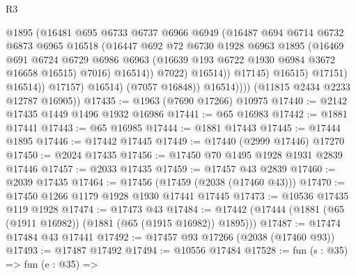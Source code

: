 \begin{lexlean}{R3}
\begin{coremodule}
                                  @1895
                                  (@16481
                                    @695
                                    @6733
                                    @6737
                                    @6966
                                    @6949
                                    (@16487
                                      @694
                                      @6714
                                      @6732
                                      @6873
                                      @6965
                                      @16518
                                      (@16447
                                        @692
                                        @72
                                        @6730
                                        @1928
                                        @6963
                                        @1895
                                        (@16469
                                          @691
                                          @6724
                                          @6729
                                          @6986
                                          @6963
                                          (@16639 @193 @6722 @1930 @6984 @3672 @16658 @16515)
                                          @7016)
                                        @16514))
                                    @7022)
                                  @16514))
                              @17145)
                            @16515)
                          @17151)
                        @16514))
                    @17157)
                  @16514)
                (@7057 @16848))
              @16514))))
      (@11815 @2434 @2233 @12787 @16905))
@17435 := @1963 (@7690 @17266) @10975
@17440 := @2142 @17435 @1449 @1496 @1932 @16986
@17441 := @65 @16983
@17442 := @1881 @17441
@17443 := @65 @16985
@17444 := @1881 @17443
@17445 := @17444 @1895
@17446 := @17442 @17445
@17449 := @17440 (@2999 @17446) @17270
@17450 := @2024 @17435
@17456 := @17450 @70 @1495 @1928 @1931 @2839 @17446
@17457 := @2033 @17435
@17459 := @17457 @43 @2839
@17460 := @2039 @17435
@17464 := @17456 (@17459 (@2038 (@17460 @43)))
@17470 := @17450 @1266 @1179 @1928 @1930 @17441 @17445
@17473 := @10536 @17435 @119 @1928
@17474 := @17473 @43
@17484 := @17442 (@17444 (@1881 (@65 (@1911 @16982)) (@1881 (@65 (@1915 @16982)) @1895)))
@17487 := @17474 @17484 @43 @17441
@17492 := @17457 @93 @17266 (@2038 (@17460 @93))
@17493 := @17487 @17492
@17494 := @10556 @17484
@17528 := fun (s : @35) =>
  fun (e : @35) =>

\end{coremodule}
\end{lexlean}

